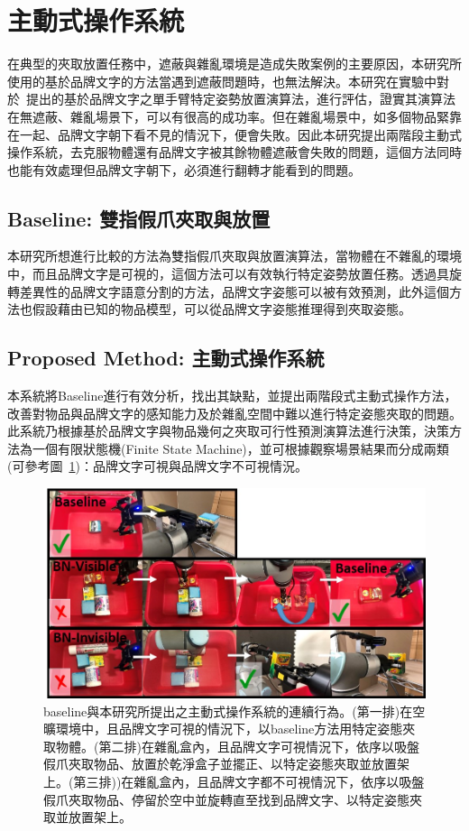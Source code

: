 \section{主動式操作系統}
在典型的夾取放置任務中，遮蔽與雜亂環境是造成失敗案例的主要原因，本研究所使用的基於品牌文字的方法當遇到遮蔽問題時，也無法解決。本研究在實驗中對於~\cite{peterthesis}提出的基於品牌文字之單手臂特定姿勢放置演算法，進行評估，證實其演算法在無遮蔽、雜亂場景下，可以有很高的成功率。但在雜亂場景中，如多個物品緊靠在一起、品牌文字朝下看不見的情況下，便會失敗。因此本研究提出兩階段主動式操作系統，去克服物體還有品牌文字被其餘物體遮蔽會失敗的問題，這個方法同時也能有效處理但品牌文字朝下，必須進行翻轉才能看到的問題。

\subsection{Baseline: 雙指假爪夾取與放置}
本研究所想進行比較的方法為雙指假爪夾取與放置演算法，當物體在不雜亂的環境中，而且品牌文字是可視的，這個方法可以有效執行特定姿勢放置任務。透過具旋轉差異性的品牌文字語意分割的方法，品牌文字姿態可以被有效預測，此外這個方法也假設藉由已知的物品模型，可以從品牌文字姿態推理得到夾取姿態。


\subsection{Proposed Method: 主動式操作系統}
本系統將Baseline進行有效分析，找出其缺點，並提出兩階段式主動式操作方法，改善對物品與品牌文字的感知能力及於雜亂空間中難以進行特定姿態夾取的問題。此系統乃根據基於品牌文字與物品幾何之夾取可行性預測演算法進行決策，決策方法為一個有限狀態機(Finite State Machine)，並可根據觀察場景結果而分成兩類(可參考圖~\ref{figure:active_manipulation_and_baseline})：品牌文字可視與品牌文字不可視情況。

\begin{figure}[ht]
	\centering
	\includegraphics[height=!, width=1.0\linewidth, keepaspectratio=true]
	{./figures/active_manipulation_and_baseline.jpg}
  \caption{baseline與本研究所提出之主動式操作系統的連續行為。(第一排)在空曠環境中，且品牌文字可視的情況下，以baseline方法用特定姿態夾取物體。(第二排)在雜亂盒內，且品牌文字可視情況下，依序以吸盤假爪夾取物品、放置於乾淨盒子並擺正、以特定姿態夾取並放置架上。(第三排))在雜亂盒內，且品牌文字都不可視情況下，依序以吸盤假爪夾取物品、停留於空中並旋轉直至找到品牌文字、以特定姿態夾取並放置架上。
	}
  \label{figure:active_manipulation_and_baseline}
\end{figure}

